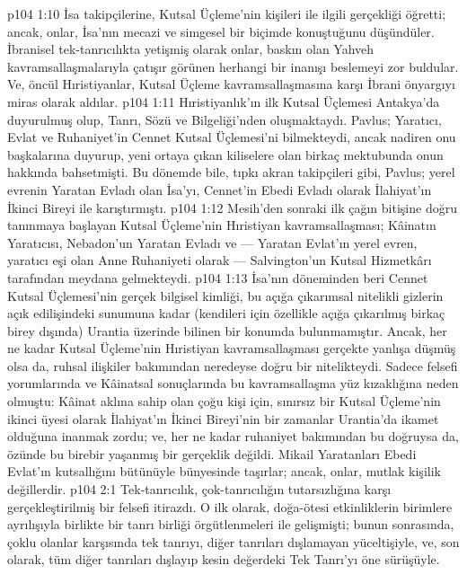 \vs p104 1:10 İsa takipçilerine, Kutsal Üçleme’nin kişileri ile ilgili gerçekliği öğretti; ancak, onlar, İsa’nın mecazi ve simgesel bir biçimde konuştuğunu düşündüler. İbranisel tek\hyp{}tanrıcılıkta yetişmiş olarak onlar, baskın olan Yahveh kavramsallaşmalarıyla çatışır görünen herhangi bir inanışı beslemeyi zor buldular. Ve, öncül Hıristiyanlar, Kutsal Üçleme kavramsallaşmasına karşı İbrani önyargıyı miras olarak aldılar.
\vs p104 1:11 Hıristiyanlık’ın ilk Kutsal Üçlemesi Antakya’da duyurulmuş olup, Tanrı, Sözü ve Bilgeliği’nden oluşmaktaydı. Pavlus; Yaratıcı, Evlat ve Ruhaniyet’in Cennet Kutsal Üçlemesi’ni bilmekteydi, ancak nadiren onu başkalarına duyurup, yeni ortaya çıkan kiliselere olan birkaç mektubunda onun hakkında bahsetmişti. Bu dönemde bile, tıpkı akran takipçileri gibi, Pavlus; yerel evrenin Yaratan Evladı olan İsa’yı, Cennet’in Ebedi Evladı olarak İlahiyat’ın İkinci Bireyi ile karıştırmıştı.
\vs p104 1:12 Mesih’den sonraki ilk çağın bitişine doğru tanınmaya başlayan Kutsal Üçleme’nin Hıristiyan kavramsallaşması; Kâinatın Yaratıcısı, Nebadon’un Yaratan Evladı ve --- Yaratan Evlat’ın yerel evren, yaratıcı eşi olan Anne Ruhaniyeti olarak --- Salvington’un Kutsal Hizmetkârı tarafından meydana gelmekteydi.
\vs p104 1:13 İsa’nın döneminden beri Cennet Kutsal Üçlemesi’nin gerçek bilgisel kimliği, bu açığa çıkarımsal nitelikli gizlerin açık edilişindeki sunumuna kadar (kendileri için özellikle açığa çıkarılmış birkaç birey dışında) Urantia üzerinde bilinen bir konumda bulunmamıştır. Ancak, her ne kadar Kutsal Üçleme’nin Hıristiyan kavramsallaşması gerçekte yanlışa düşmüş olsa da, ruhsal ilişkiler bakımından neredeyse doğru bir nitelikteydi. Sadece felsefi yorumlarında ve Kâinatsal sonuçlarında bu kavramsallaşma yüz kızaklığına neden olmuştu: Kâinat aklına sahip olan çoğu kişi için, sınırsız bir Kutsal Üçleme’nin ikinci üyesi olarak İlahiyat’ın İkinci Bireyi’nin bir zamanlar Urantia’da ikamet olduğuna inanmak zordu; ve, her ne kadar ruhaniyet bakımından bu doğruysa da, özünde bu birebir yaşanmış bir gerçeklik değildi. Mikail Yaratanları Ebedi Evlat’ın kutsallığını bütünüyle bünyesinde taşırlar; ancak, onlar, mutlak kişilik değillerdir.
\vs p104 2:1 Tek\hyp{}tanrıcılık, çok\hyp{}tanrıcılığın tutarsızlığına karşı gerçekleştirilmiş bir felsefi itirazdı. O ilk olarak, doğa\hyp{}ötesi etkinliklerin birimlere ayrılışıyla birlikte bir tanrı birliği örgütlenmeleri ile gelişmişti; bunun sonrasında, çoklu olanlar karşısında tek tanrıyı, diğer tanrıları dışlamayan yüceltişiyle, ve, son olarak, tüm diğer tanrıları dışlayıp kesin değerdeki Tek Tanrı’yı öne sürüşüyle.
